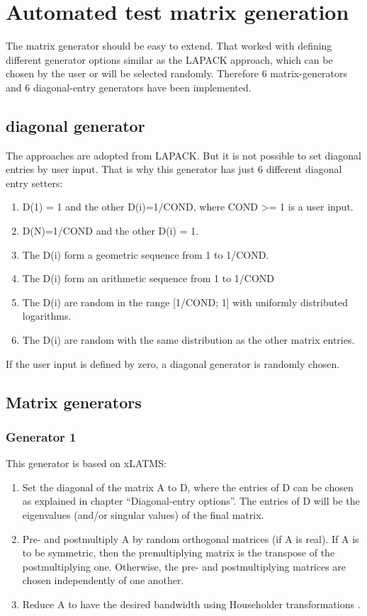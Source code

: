 \documentclass[parskip=full]{scrartcl}
\begin{document}
\section{Automated test matrix generation}

The matrix generator should be easy to extend.  
That worked with defining different generator options similar as the LAPACK approach, which can be chosen by the user or will be selected randomly.
Therefore 6 matrix-generators and 6 diagonal-entry generators have been implemented.

\subsection{diagonal generator}
The approaches are adopted from LAPACK. But it is not possible to set diagonal entries by user input. That is why this generator has just 6 different diagonal entry setters:
\begin{enumerate}
	\item D(1) = 1 and the other D(i)=1/COND, where COND >= 1 is a user input.
	\item D(N)=1/COND and the other D(i) = 1. 
	\item The D(i) form a geometric sequence from 1 to 1/COND. 
	\item The D(i) form an arithmetic sequence from 1 to 1/COND
	\item The D(i) are random in the range [1/COND; 1] with uniformly distributed logarithms. 
	\item The D(i) are random with the same distribution as the other matrix entries.
\end{enumerate}
If the user input is defined by zero, a diagonal generator is randomly chosen.

\subsection{Matrix generators}

\subsubsection{Generator 1}
This generator is based on xLATMS: 

\begin{enumerate}
	\item Set the diagonal of the matrix A to D, where the entries of D can be chosen as explained in chapter “Diagonal-entry options”. The entries of D will be the eigenvalues (and/or singular values) of the final matrix.
	\item Pre- and postmultiply A by random orthogonal matrices (if A is real). If A is to be symmetric, then the premultiplying matrix is the transpose of the postmultiplying one. Otherwise, the pre- and postmultiplying matrices are chosen independently of one another.
	\item Reduce A to have the desired bandwidth using Householder transformations \cite{numerikskript}.
\end{enumerate}
\end{document}
